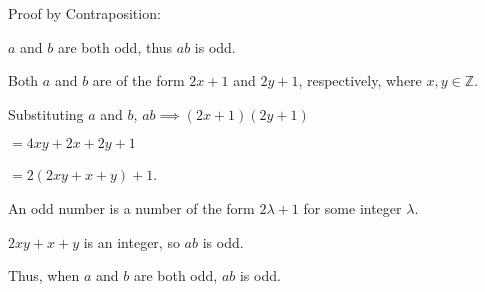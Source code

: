 \documentclass{article}
\newenvironment{Problem}
{\noindent\color{black}}
{\newline}
\newenvironment{Solution}
{\noindent\color{red}}
{\newline}
\begin{document}
\begin{Solution}
    Proof by Contraposition:

    \begin{adjustwidth}{2em}{0em}
        $a$ and $b$ are both odd, thus $ab$ is odd. 

        \phantom{ }

        Both $a$ and $b$ are of the form $2x + 1$ and $2y + 1$, 
        respectively, where $x,y \in \mathbb Z$. 

        \phantom{ }

        Substituting $a$ and $b$, $ab \implies (2x + 1)(2y + 1)$
        
        \hspace*{12em}$= 4xy + 2x + 2y + 1$ 
        
        \hspace*{12em}$= 2(2xy + x + y) + 1$.

        \phantom{ }

        An odd number is a number of the form $2\lambda + 1$
        for some integer $\lambda$.

        $2xy + x + y$ is an integer, so $ab$ is odd.

        \phantom{ }

        Thus, when $a$ and $b$ are both odd, $ab$ is odd.

    \end{adjustwidth}
    \phantom{ }
\end{Solution}




\end{document}

